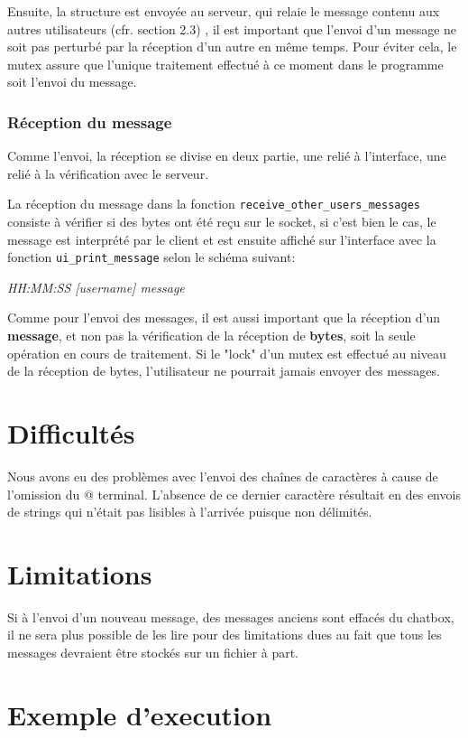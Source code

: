                 Ensuite, la structure est envoyée au serveur, qui relaie le message contenu
                aux autres utilisateurs (cfr. section 2.3) , il est important que
                l'envoi d'un message ne soit pas perturbé par la réception d'un autre en même temps.
                Pour éviter cela, le mutex assure que l'unique traitement effectué à ce moment 
                dans le programme soit l'envoi du message.

            \subsubsection{Réception du message}
                Comme l'envoi, la réception se divise en deux partie, une relié à 
                l'interface, une relié à la vérification avec le serveur.
                
                La réception du message dans la fonction \texttt{receive\_other\_users\_messages}
                consiste à vérifier si des bytes ont été reçu sur le socket,
                si c'est bien le cas, le message est interprété par le client et est ensuite 
                affiché sur l'interface avec la fonction \texttt{ui\_print\_message} selon le schéma suivant: \\
                \begin{center}
                    \textit{HH:MM:SS [username] message} 
                \end{center}
                Comme pour l'envoi des messages, il est aussi important que
                la réception d'un \textbf{message}, et non pas la vérification de la réception de \textbf{bytes},
                soit la seule opération en cours de traitement. Si le "lock" d'un mutex
                est effectué au niveau de la réception de bytes, l'utilisateur ne pourrait jamais
                envoyer des messages.
                
        \section{Difficultés}

        Nous avons eu des problèmes avec l'envoi des chaînes de
        caractères à cause de l'omission du \verb@\0@ terminal.
        L'absence de ce dernier caractère résultait en des envois de strings
        qui n'était pas lisibles à l'arrivée puisque non délimités.
                
                

        \section{Limitations}
            Si à l'envoi d'un nouveau message, des messages anciens sont effacés du chatbox,
            il ne sera plus possible de les lire pour des limitations dues au fait que tous les messages
            devraient être stockés sur un fichier à part.
        
        \section{Exemple d'execution}

